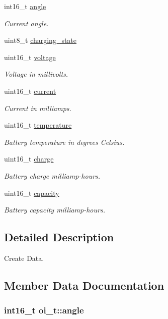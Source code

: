 \begin{DoxyCompactItemize}
int16\_\-t \hyperlink{structoi__t_a872475e474e2317ed1c6f3ed8fd69f01}{angle}
\begin{DoxyCompactList}\small\item\em Current angle. \end{DoxyCompactList}\item 
uint8\_\-t \hyperlink{structoi__t_ae5f22bf498c302589ab9723a12214990}{charging\_\-state}
\item 
uint16\_\-t \hyperlink{structoi__t_ab69770425f311cab427fb07caef36bc6}{voltage}
\begin{DoxyCompactList}\small\item\em Voltage in millivolts. \end{DoxyCompactList}\item 
uint16\_\-t \hyperlink{structoi__t_a4f77c70d4bd463033f985bfaceb7c138}{current}
\begin{DoxyCompactList}\small\item\em Current in milliamps. \end{DoxyCompactList}\item 
uint16\_\-t \hyperlink{structoi__t_a9e162ade52f5b71fb92ac67c0cf76f76}{temperature}
\begin{DoxyCompactList}\small\item\em Battery temperature in degrees Celsius. \end{DoxyCompactList}\item 
uint16\_\-t \hyperlink{structoi__t_af021bc9cdad4bf3a1793d242f314b498}{charge}
\begin{DoxyCompactList}\small\item\em Battery charge milliamp-\/hours. \end{DoxyCompactList}\item 
uint16\_\-t \hyperlink{structoi__t_a84f2bdc6865e9aeffbb0752612f74074}{capacity}
\begin{DoxyCompactList}\small\item\em Battery capacity milliamp-\/hours. \end{DoxyCompactList}\end{DoxyCompactItemize}


\subsection{Detailed Description}
Create Data. 

\subsection{Member Data Documentation}
\hypertarget{structoi__t_a872475e474e2317ed1c6f3ed8fd69f01}{
\subsubsection[{angle}]{\setlength{\rightskip}{0pt plus 5cm}int16\_\-t {\bf oi\_\-t::angle}}}
\label{structoi__t_a872475e474e2317ed1c6f3ed8fd69f01}


